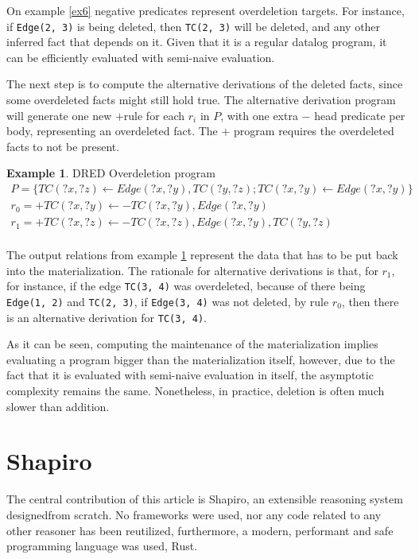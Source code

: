 \documentclass[manuscript,screen,review]{acmart}
\theoremstyle{definition}
\newtheorem{exmp}{Example}[section]
\begin{document}
On example \ref{ex6} negative predicates represent overdeletion targets. For instance, if \verb|Edge(2, 3)| is being deleted, then \verb|TC(2, 3)| will be deleted, and any other inferred fact that depends on it. Given that it is a regular datalog program, it can be efficiently evaluated with semi-naive evaluation.

The next step is to compute the alternative derivations of the deleted facts, since some overdeleted facts might still hold true. The alternative derivation program will generate one new $+$rule for each $r_i$ in $P$, with one extra $-$ head predicate per body, representing an overdeleted fact. The $+$ program requires the overdeleted facts to not be present.

\begin{exmp}{DRED Overdeletion program}
	\begin{align}
		P = \{ TC(?x, ?z) \leftarrow Edge(?x, ?y), TC(?y, ?z); TC(?x, ?y) \leftarrow Edge(?x, ?y) \} \nonumber                                                           \\
		r_0 = +TC(?x, ?y) \leftarrow -TC(?x, ?y), Edge(?x, ?y)                                                                                                           \\
		r_1 = +TC(?x, ?z) \leftarrow -TC(?x, ?z), Edge(?x, ?y), TC(?y, ?z)                                                                                     \nonumber \\
	\end{align}
	\label{ex7}
\end{exmp}

The output relations from example \ref{ex7} represent the data that has to be put back into the materialization. The rationale for alternative derivations is that, for $r_1$, for instance, if the edge \verb|TC(3, 4)| was overdeleted, because of there being \verb|Edge(1, 2)| and \verb|TC(2, 3)|, if \verb|Edge(3, 4)| was not deleted, by rule $r_0$, then there is an alternative derivation for \verb|TC(3, 4)|.

As it can be seen, computing the maintenance of the materialization implies evaluating a program bigger than the materialization itself, however, due to the fact that it is evaluated with semi-naive evaluation in itself, the asymptotic complexity remains the same\cite{complexity_of_dred}. Nonetheless, in practice, deletion is often much slower than addition.

\section{Shapiro}
The central contribution of this article is Shapiro, an extensible reasoning system designedfrom scratch. No frameworks
were used, nor any code related to any other reasoner has been reutilized, furthermore, a modern, performant and safe programming
language was used, Rust\cite{rust_lang}.
\end{document}
